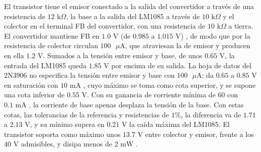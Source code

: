 \documentclass[../../General.tex]{subfiles}
\begin{document}
El transistor tiene el emisor conectado a la salida del convertidor a través de una resistencia de $12\text{ k}\Omega$, la base a la salida del LM1085 a través de $10\text{ k}\Omega$ y el colector en el terminal FB del convertidor, con una resistencia de $10\text{ k}\Omega$ a tierra. El convertidor mantiene FB en $1.0\text{ V}$ (de $0.985$ a $1.015\text{ V}$) \citep{ti_lmr33630}, de modo que por la resistencia de colector circulan $100\text{ }\mu\text{A}$, que atraviesan la de emisor y producen en ella $1.2\text{ V}$. Sumados a la tensión entre emisor y base, de unos $0.65\text{ V}$, la entrada del LM1085 queda $1.85\text{ V}$ por encima de su salida. La hoja de datos del 2N3906 no especifica la tensión entre emisor y base con $100\text{ }\mu\text{A}$; da $0.65$ a $0.85\text{ V}$ en saturación con $10\text{ mA}$ \citep{onsemi_2n3906}, cuyo máximo se toma como cota superior, y se supone una cota inferior de $0.55\text{ V}$. Con su ganancia de corriente mínima de $60$ con $0.1\text{ mA}$ \citep{onsemi_2n3906}, la corriente de base apenas desplaza la tensión de la base. Con estas cotas, las tolerancias de la referencia y resistencias de $1\%$, la diferencia va de $1.71$ a $2.13\text{ V}$, y su mínimo supera en $0.21\text{ V}$ la caída máxima del LM1085. El transistor soporta como máximo unos $13.7\text{ V}$ entre colector y emisor, frente a los $40\text{ V}$ admisibles, y disipa menos de $2\text{ mW}$ \citep{onsemi_2n3906}.
\end{document}
